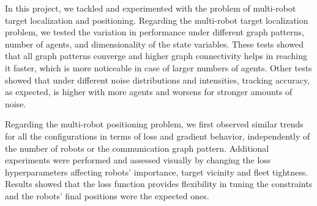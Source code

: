 \documentclass[a4paper,11pt,oneside]{book}
\begin{document}
In this project, we tackled and experimented with the problem of multi-robot target localization and positioning. Regarding the multi-robot target localization problem, we tested the variation in performance under different graph patterns, number of agents, and dimensionality of the state variables. These tests showed that all graph patterns converge and higher graph connectivity helps in reaching it faster, which is more noticeable in case of larger numbers of agents. Other tests showed that under different noise distributions and intensities, tracking accuracy, as expected, is higher with more agents and worsens for stronger amounts of noise.

Regarding the multi-robot positioning problem, we first observed similar trends for all the configurations in terms of loss and gradient behavior, independently of the number of robots or the communication graph pattern. Additional experiments were performed and assessed visually by changing the loss hyperparameters affecting robots' importance, target vicinity and fleet tightness. Results showed that the loss function provides flexibility in tuning the constraints and the robots' final positions were the expected ones.



\end{document}

